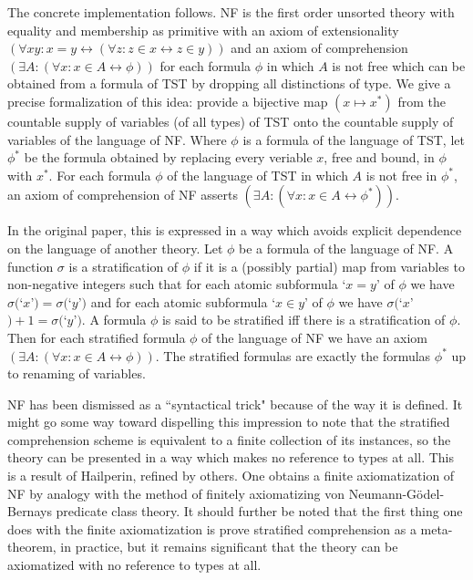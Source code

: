 \documentclass[12pt]{article}
\begin{document}
The concrete implementation follows.  NF is the first order unsorted theory with equality and membership as primitive with an axiom of extensionality $(\forall xy:x=y \leftrightarrow (\forall z:z \in x \leftrightarrow z\in y))$ and an axiom of comprehension $(\exists A:(\forall x:x \in A \leftrightarrow \phi))$ for each formula $\phi$ in which $A$ is not free which can be obtained from a formula of TST by dropping all distinctions of type.  We give a precise formalization of this idea:  provide a bijective map $(x \mapsto x^*)$ from the countable supply of variables (of all types) of TST onto the countable supply of variables of the language of NF.  Where $\phi$ is a formula of the language of TST, let $\phi^*$ be the formula obtained by replacing every veriable $x$, free and bound,
in $\phi$ with $x^*$. For each formula $\phi$ of the language of TST in which $A$ is not free in $\phi^*$, an axiom of comprehension of NF asserts $(\exists A:(\forall x:x \in A \leftrightarrow \phi^*))$.

In the original paper, this is expressed in a way which avoids explicit dependence on the language of another theory.  Let $\phi$ be a formula of the language of
NF.  A function $\sigma$ is a stratification of $\phi$ if it is a (possibly partial) map from variables to non-negative integers such that for each atomic subformula
`$x=y$'  of $\phi$ we have $\sigma($`$x$'$)=\sigma($`$y$'$)$ and for each atomic subformula `$x \in y$' of $\phi$ we have $\sigma($`$x$'$)+1 = \sigma($`$y$'$)$.
A formula $\phi$ is said to be stratified iff there is a stratification of $\phi$.  Then for each stratified formula $\phi$ of the language of NF we have an axiom $(\exists A:(\forall x:x \in A \leftrightarrow \phi))$.  The stratified formulas are exactly the formulas $\phi^*$ up to renaming of variables.

NF has been dismissed as a ``syntactical trick" because of the way it is defined.  It might go some way toward dispelling this impression to note that the stratified comprehension scheme is equivalent to a finite collection of its instances, so the theory can be presented in a way which makes no reference to types at all.  This is a result of Hailperin, refined by others.  One obtains a finite axiomatization of NF by analogy with the method of finitely axiomatizing von Neumann-G\"odel-Bernays predicate class theory.  It should further be noted that the first thing one does with the finite axiomatization is prove stratified comprehension as a meta-theorem, in practice, but it remains significant that the theory can be axiomatized with no reference to types at all.
\end{document}
